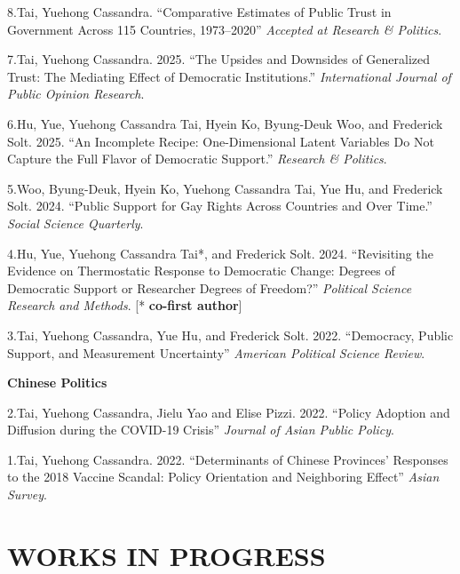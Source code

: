 \documentclass[10.5pt,]{article}
\providecommand{\tightlist}{%
	\setlength{\itemsep}{0pt}\setlength{\parskip}{0pt}}
\renewenvironment{itemize}{
	\begin{list}{}{
			\setlength{\leftmargin}{1.5em}
		}
	}{
	\end{list}
}
\begin{document}
\begin{itemize}
  \begin{itemize}
  \tightlist
  \item
    8.Tai, Yuehong Cassandra. ``Comparative Estimates of Public Trust in
    Government Across 115 Countries, 1973--2020'' \emph{Accepted at
    Research \& Politics}.
  \item
    7.Tai, Yuehong Cassandra. 2025. ``The Upsides and Downsides of
    Generalized Trust: The Mediating Effect of Democratic
    Institutions.'' \emph{International Journal of Public Opinion
    Research}.
  \item
    6.Hu, Yue, Yuehong Cassandra Tai, Hyein Ko, Byung-Deuk Woo, and
    Frederick Solt. 2025. ``An Incomplete Recipe: One-Dimensional Latent
    Variables Do Not Capture the Full Flavor of Democratic Support.''
    \emph{Research \& Politics}.
  \item
    5.Woo, Byung-Deuk, Hyein Ko, Yuehong Cassandra Tai, Yue Hu, and
    Frederick Solt. 2024. ``Public Support for Gay Rights Across
    Countries and Over Time.'' \emph{Social Science Quarterly}.
  \item
    4.Hu, Yue, Yuehong Cassandra Tai*, and Frederick Solt. 2024.
    ``Revisiting the Evidence on Thermostatic Response to Democratic
    Change: Degrees of Democratic Support or Researcher Degrees of
    Freedom?'' \emph{Political Science Research and Methods}. {[}*
    \textbf{co-first author}{]}
  \item
    3.Tai, Yuehong Cassandra, Yue Hu, and Frederick Solt. 2022.
    ``Democracy, Public Support, and Measurement Uncertainty''
    \emph{American Political Science Review}.
  \end{itemize}
\item
  \textbf{Chinese Politics}

  \begin{itemize}
  \tightlist
  \item
    2.Tai, Yuehong Cassandra, Jielu Yao and Elise Pizzi. 2022. ``Policy
    Adoption and Diffusion during the COVID-19 Crisis'' \emph{Journal of
    Asian Public Policy}.
  \item
    1.Tai, Yuehong Cassandra. 2022. ``Determinants of Chinese Provinces'
    Responses to the 2018 Vaccine Scandal: Policy Orientation and
    Neighboring Effect'' \emph{Asian Survey}.
  \end{itemize}
\end{itemize}

\section{WORKS IN PROGRESS}\label{works-in-progress}
\end{document}
